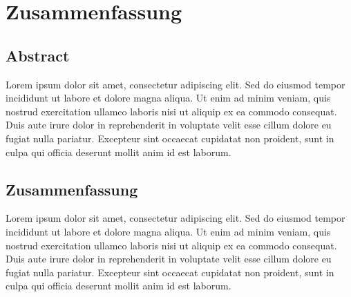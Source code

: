 \chapter*{Zusammenfassung}

\section*{Abstract}

Lorem ipsum dolor sit amet, consectetur adipiscing elit. Sed do eiusmod tempor incididunt ut labore et dolore magna aliqua.
Ut enim ad minim veniam, quis nostrud exercitation ullamco laboris nisi ut aliquip ex ea commodo consequat. Duis aute irure dolor in reprehenderit in voluptate velit esse cillum dolore eu fugiat nulla pariatur.
Excepteur sint occaecat cupidatat non proident, sunt in culpa qui officia deserunt mollit anim id est laborum.


\vspace{1cm}

\section*{Zusammenfassung}

Lorem ipsum dolor sit amet, consectetur adipiscing elit. Sed do eiusmod tempor incididunt ut labore et dolore magna aliqua.
Ut enim ad minim veniam, quis nostrud exercitation ullamco laboris nisi ut aliquip ex ea commodo consequat. Duis aute irure dolor in reprehenderit in voluptate velit esse cillum dolore eu fugiat nulla pariatur.
Excepteur sint occaecat cupidatat non proident, sunt in culpa qui officia deserunt mollit anim id est laborum.

